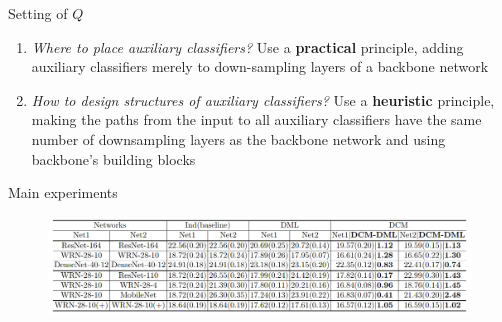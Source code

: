 \documentclass{beamer}
\begin{document}
\begin{frame}{Setting of $Q$}
    \begin{enumerate}
        \item \textit{Where to place auxiliary classifiers?}
        Use a \textbf{practical} principle, adding auxiliary classifiers merely to down-sampling layers of a backbone network
        \item \textit{How to design structures of auxiliary classifiers?}
        Use a \textbf{heuristic} principle, making the paths from the input to all auxiliary classifiers have the same number of downsampling layers as the backbone network and using backbone’s building blocks
    \end{enumerate}
\end{frame}

\begin{frame}{Main experiments}
    \begin{figure}[h]
        \includegraphics[scale=0.25]{images/table1.png}
     \end{figure}
\end{frame}
\end{document}
